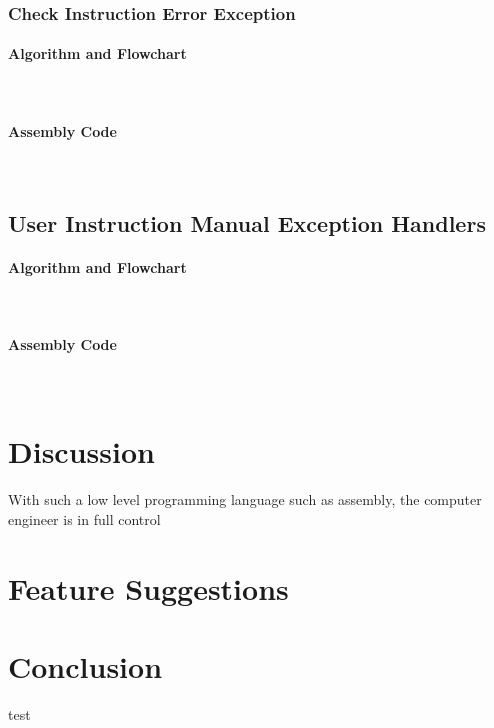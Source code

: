 \documentclass[12pt]{article}
\begin{document}
			\subsubsection{Check Instruction Error Exception}
			\paragraph{Algorithm and Flowchart}~\\
			\paragraph{Assembly Code}~\\				
			
			\subsection{User Instruction Manual Exception Handlers}
			\paragraph{Algorithm and Flowchart}~\\
			\paragraph{Assembly Code}~\\
			
			\section{Discussion}
			With such a low level programming language such as assembly, the computer engineer is in full control 
			\section{Feature Suggestions}
			
			\section{Conclusion}
			
			\begin{thebibliography}{1}
				 test
			\end{thebibliography}
\end{document}
